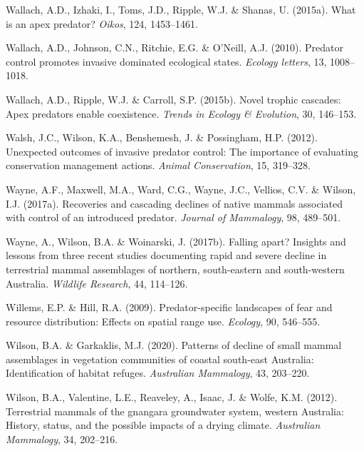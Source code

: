 \documentclass[11pt,a4paper,titlepage,twoside,openright]{style/unimelbthesis}
\begin{document}
\begin{mainmatter}
\leavevmode\hypertarget{ref-wallach2015apex}{}%
Wallach, A.D., Izhaki, I., Toms, J.D., Ripple, W.J. \& Shanas, U. (2015a). What is an apex predator? \emph{Oikos}, 124, 1453--1461.

\leavevmode\hypertarget{ref-wallach2010predator}{}%
Wallach, A.D., Johnson, C.N., Ritchie, E.G. \& O'Neill, A.J. (2010). Predator control promotes invasive dominated ecological states. \emph{Ecology letters}, 13, 1008--1018.

\leavevmode\hypertarget{ref-wallach2015novel}{}%
Wallach, A.D., Ripple, W.J. \& Carroll, S.P. (2015b). Novel trophic cascades: Apex predators enable coexistence. \emph{Trends in Ecology \& Evolution}, 30, 146--153.

\leavevmode\hypertarget{ref-walsh2012unexpected}{}%
Walsh, J.C., Wilson, K.A., Benshemesh, J. \& Possingham, H.P. (2012). Unexpected outcomes of invasive predator control: The importance of evaluating conservation management actions. \emph{Animal Conservation}, 15, 319--328.

\leavevmode\hypertarget{ref-wayne2017recoveries}{}%
Wayne, A.F., Maxwell, M.A., Ward, C.G., Wayne, J.C., Vellios, C.V. \& Wilson, I.J. (2017a). Recoveries and cascading declines of native mammals associated with control of an introduced predator. \emph{Journal of Mammalogy}, 98, 489--501.

\leavevmode\hypertarget{ref-wayne2017falling}{}%
Wayne, A., Wilson, B.A. \& Woinarski, J. (2017b). Falling apart? Insights and lessons from three recent studies documenting rapid and severe decline in terrestrial mammal assemblages of northern, south-eastern and south-western Australia. \emph{Wildlife Research}, 44, 114--126.

\leavevmode\hypertarget{ref-willems2009predator}{}%
Willems, E.P. \& Hill, R.A. (2009). Predator-specific landscapes of fear and resource distribution: Effects on spatial range use. \emph{Ecology}, 90, 546--555.

\leavevmode\hypertarget{ref-wilson2020patterns}{}%
Wilson, B.A. \& Garkaklis, M.J. (2020). Patterns of decline of small mammal assemblages in vegetation communities of coastal south-east Australia: Identification of habitat refuges. \emph{Australian Mammalogy}, 43, 203--220.

\leavevmode\hypertarget{ref-wilson2012terrestrial}{}%
Wilson, B.A., Valentine, L.E., Reaveley, A., Isaac, J. \& Wolfe, K.M. (2012). Terrestrial mammals of the gnangara groundwater system, western Australia: History, status, and the possible impacts of a drying climate. \emph{Australian Mammalogy}, 34, 202--216.


\end{mainmatter}
\end{document}
